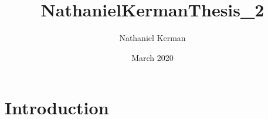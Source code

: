 \documentclass{article}
\title{NathanielKermanThesis_2}
\author{Nathaniel Kerman}
\date{March 2020}
\begin{document}
\maketitle

\section{Introduction}
\end{document}
